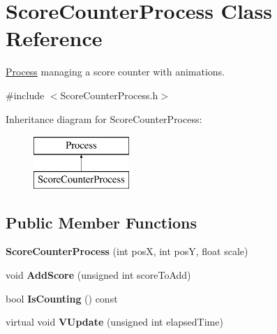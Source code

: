 \hypertarget{classScoreCounterProcess}{\section{Score\-Counter\-Process Class Reference}
\label{classScoreCounterProcess}
}


\hyperlink{classProcess}{Process} managing a score counter with animations.  




{\ttfamily \#include $<$Score\-Counter\-Process.\-h$>$}

Inheritance diagram for Score\-Counter\-Process\-:\begin{figure}[H]
\begin{center}
\leavevmode
\includegraphics[height=2.000000cm]{classScoreCounterProcess}
\end{center}
\end{figure}
\subsection*{Public Member Functions}
\begin{DoxyCompactItemize}
\item 
\hypertarget{classScoreCounterProcess_a8a572226d6cbd53342ecd50faa592b57}{{\bfseries Score\-Counter\-Process} (int pos\-X, int pos\-Y, float scale)}\label{classScoreCounterProcess_a8a572226d6cbd53342ecd50faa592b57}

\item 
\hypertarget{classScoreCounterProcess_a7840627f7145a4ee1f85d0de2ae45e4f}{void {\bfseries Add\-Score} (unsigned int score\-To\-Add)}\label{classScoreCounterProcess_a7840627f7145a4ee1f85d0de2ae45e4f}

\item 
\hypertarget{classScoreCounterProcess_afd07b9e971d8f50b16ad0af663110ff0}{bool {\bfseries Is\-Counting} () const }\label{classScoreCounterProcess_afd07b9e971d8f50b16ad0af663110ff0}

\item 
\hypertarget{classScoreCounterProcess_a6bc6b75b8f39112b54a08d812d843606}{virtual void {\bfseries V\-Update} (unsigned int elapsed\-Time)}\label{classScoreCounterProcess_a6bc6b75b8f39112b54a08d812d843606}

\end{DoxyCompactItemize}
